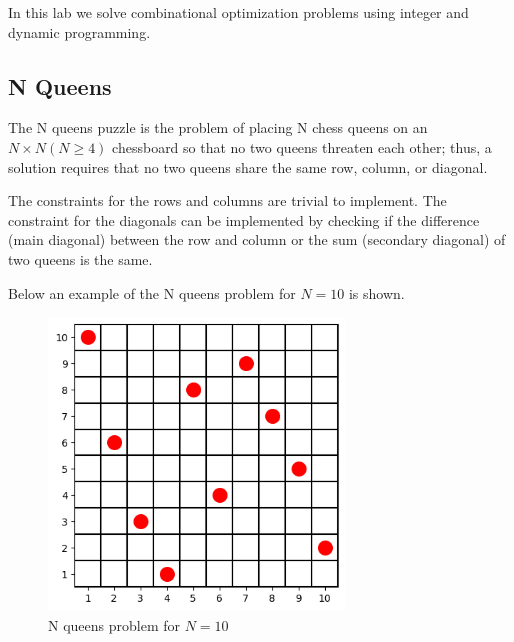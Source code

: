 In this lab we solve combinational optimization problems using integer and dynamic programming.
\subsection{N Queens}
The N queens puzzle is the problem of placing N chess queens on an $N\times N (N\ge 4)$ chessboard so that no two queens threaten each other; thus, a solution requires that no two queens share the same row, column, or diagonal.

The constraints for the rows and columns are trivial to implement. The constraint for the diagonals can be implemented by checking if the difference (main diagonal) between the row and column or the sum (secondary diagonal) of two queens is the same.

Below an example of the N queens problem for $N=10$ is shown.
\begin{figure}
    \centering
    \includegraphics[width=0.7\textwidth]{lab11/imgs/nqueens.png}
    \caption{N queens problem for $N=10$}
    \label{fig:nqueens}
\end{figure}

